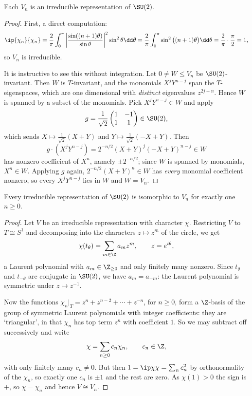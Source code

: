 \begin{theorem}
	Each $V_n$ is an irreducible representation of $\SU(2)$.
\end{theorem}
\begin{proof}
	First, a direct computation:
	$$\ip{\chi_n}{\chi_n} = \frac2\pi\int_0^\pi\left|\frac{\sin((n+1)\theta)}{\sin\theta}\right|^2\sin^2\theta\dd\theta = \frac2\pi\int_0^\pi\sin^2\big((n+1)\theta\big)\dd\theta = \frac2\pi\cdot\frac\pi2 = 1,$$
	so $V_n$ is irreducible.

	It is instructive to see this without integration. Let $0\neq W\leq V_n$ be $\SU(2)$-invariant. Then $W$ is $T$-invariant, and the monomials $X^jY^{n-j}$ span the $T$-eigenspaces, which are one dimensional with \emph{distinct} eigenvalues $z^{2j-n}$. Hence $W$ is spanned by a subset of the monomials. Pick $X^jY^{n-j}\in W$ and apply
	$$g = \frac1{\sqrt2}\begin{pmatrix}1&-1\\1&1\end{pmatrix}\in\SU(2),$$
	which sends $X\mapsto\frac{1}{\sqrt2}(X+Y)$ and $Y\mapsto\frac1{\sqrt2}(-X+Y)$. Then
	$$g\cdot(X^jY^{n-j}) = 2^{-n/2}(X+Y)^j(-X+Y)^{n-j}\in W$$
	has nonzero coefficient of $X^n$, namely $\pm2^{-n/2}$; since $W$ is spanned by monomials, $X^n\in W$. Applying $g$ again, $2^{-n/2}(X+Y)^n\in W$ has \emph{every} monomial coefficient nonzero, so every $X^jY^{n-j}$ lies in $W$ and $W = V_n$.
\end{proof}

\begin{theorem}
	Every irreducible representation of $\SU(2)$ is isomorphic to $V_n$ for exactly one $n\geq0$.
\end{theorem}
\begin{proof}
	Let $V$ be an irreducible representation with character $\chi$. Restricting $V$ to $T\cong S^1$ and decomposing into the characters $z\mapsto z^m$ of the circle, we get
	$$\chi(t_\theta) = \sum_{m\in\Z}a_mz^m, \qquad z = e^{i\theta},$$
	a Laurent polynomial with $a_m\in\Z_{\geq0}$ and only finitely many nonzero. Since $t_\theta$ and $t_{-\theta}$ are conjugate in $\SU(2)$, we have $a_m = a_{-m}$: the Laurent polynomial is symmetric under $z\mapsto z^{-1}$.

	Now the functions $\chi_n|_T = z^n+z^{n-2}+\cdots+z^{-n}$, for $n\geq 0$, form a $\Z$-basis of the group of symmetric Laurent polynomials with integer coefficients: they are `triangular', in that $\chi_n$ has top term $z^n$ with coefficient $1$. So we may subtract off successively and write
	$$\chi = \sum_{n\geq0}c_n\chi_n, \qquad c_n\in\Z,$$
	with only finitely many $c_n\neq0$. But then $1 = \ip\chi\chi = \sum_nc_n^2$ by orthonormality of the $\chi_n$, so exactly one $c_n$ is $\pm1$ and the rest are zero. As $\chi(1) > 0$ the sign is $+$, so $\chi = \chi_n$ and hence $V\cong V_n$.
\end{proof}

